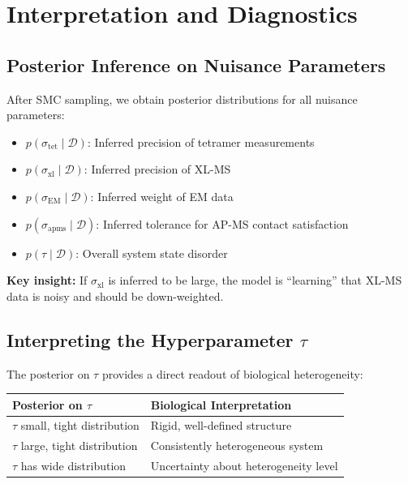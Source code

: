 \documentclass[11pt,a4paper]{article}
\theoremstyle{definition}
\begin{document}
\section{Interpretation and Diagnostics}

\subsection{Posterior Inference on Nuisance Parameters}

After SMC sampling, we obtain posterior distributions for all nuisance parameters:
\begin{itemize}
    \item $p(\sigma_{\text{tet}} \mid \mathcal{D})$: Inferred precision of tetramer measurements
    \item $p(\sigma_{\text{xl}} \mid \mathcal{D})$: Inferred precision of XL-MS
    \item $p(\sigma_{\text{EM}} \mid \mathcal{D})$: Inferred weight of EM data
    \item $p(\sigma_{\text{apms}} \mid \mathcal{D})$: Inferred tolerance for AP-MS contact satisfaction
    \item $p(\tau \mid \mathcal{D})$: Overall system state disorder
\end{itemize}

\textbf{Key insight:} If $\sigma_{\text{xl}}$ is inferred to be large, the model is ``learning'' that XL-MS data is noisy and should be down-weighted.

\subsection{Interpreting the Hyperparameter $\tau$}

The posterior on $\tau$ provides a direct readout of biological heterogeneity:

\begin{center}
\begin{tabular}{ll}
\toprule
\textbf{Posterior on $\tau$} & \textbf{Biological Interpretation} \\
\midrule
$\tau$ small, tight distribution & Rigid, well-defined structure \\
$\tau$ large, tight distribution & Consistently heterogeneous system \\
$\tau$ has wide distribution & Uncertainty about heterogeneity level \\
\bottomrule
\end{tabular}
\end{center}
\end{document}
